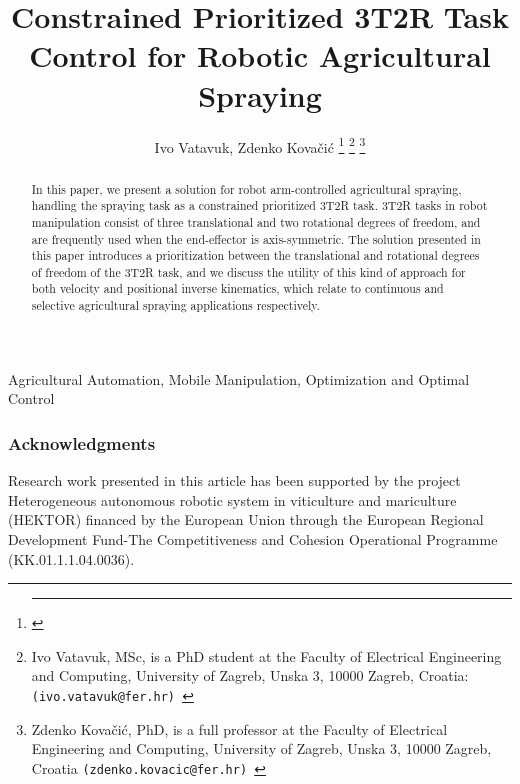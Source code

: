 \documentclass[letterpaper, 10 pt, conference]{ieeeconf}
\title{\LARGE \bf
	Constrained Prioritized 3T2R Task Control for Robotic Agricultural Spraying  
}
\author{Ivo Vatavuk, Zdenko Kovačić
	\thanks{\hrule}
	\thanks{Ivo Vatavuk, MSc, is a PhD student at the Faculty of Electrical Engineering and Computing,
	University of Zagreb, Unska 3, 10000 Zagreb, Croatia: \tt(ivo.vatavuk@fer.hr)
	}
	\thanks{
	Zdenko Kovačić, PhD, is a full professor at the Faculty of Electrical Engineering and Computing,
	University of Zagreb, Unska 3, 10000 Zagreb, Croatia \tt(zdenko.kovacic@fer.hr)
	}}%
\begin{document}
	
	\maketitle
	\thispagestyle{empty}
	\pagestyle{empty}
	
	\begin{abstract}
		In this paper, we present a solution for robot arm-controlled agricultural spraying, handling the spraying task as a constrained prioritized 3T2R task. 3T2R tasks in robot manipulation consist of three translational and two rotational degrees of freedom, and are frequently used when the end-effector is axis-symmetric. The solution presented in this paper introduces a prioritization between the translational and rotational degrees of freedom of the 3T2R task, and we discuss the utility of this kind of approach for both velocity and positional inverse kinematics, which relate to continuous and selective agricultural spraying applications respectively.       
	\end{abstract}
	\begin{keywords}
	Agricultural Automation, Mobile Manipulation, Optimization and Optimal Control 
	\end{keywords}
	
        
        
	
	
	\subsubsection*{Acknowledgments}
	Research work presented in this article has been supported by the project Heterogeneous autonomous robotic system in viticulture and mariculture (HEKTOR) financed by the European Union through the European Regional Development Fund-The Competitiveness and Cohesion Operational Programme (KK.01.1.1.04.0036).
	\nocite{*}
	
	
	
\end{document}

